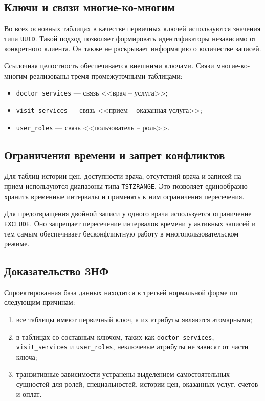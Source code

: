 \subsection{Ключи и связи многие-ко-многим}

Во всех основных таблицах в качестве первичных ключей используются значения типа \texttt{UUID}. Такой подход позволяет формировать идентификаторы независимо от конкретного клиента. Он также не раскрывает информацию о количестве записей.

Ссылочная целостность обеспечивается внешними ключами. Связи многие-ко-многим реализованы тремя промежуточными таблицами:
\begin{itemize}
    \item \texttt{doctor\_services} --- связь <<врач -- услуга>>;
    \item \texttt{visit\_services} --- связь <<прием -- оказанная услуга>>;
    \item \texttt{user\_roles} --- связь <<пользователь -- роль>>.
\end{itemize}

\subsection{Ограничения времени и запрет конфликтов}

Для таблиц истории цен, доступности врача, отсутствий врача и записей на прием используются диапазоны типа \texttt{TSTZRANGE}. Это позволяет единообразно хранить временные интервалы и применять к ним ограничения пересечения.

Для предотвращения двойной записи у одного врача используется ограничение \texttt{EXCLUDE}. Оно запрещает пересечение интервалов времени у активных записей и тем самым обеспечивает бесконфликтную работу в многопользовательском режиме.

\subsection{Доказательство 3НФ}

Спроектированная база данных находится в третьей нормальной форме по следующим причинам:
\begin{enumerate}
    \item все таблицы имеют первичный ключ, а их атрибуты являются атомарными;
    \item в таблицах со составным ключом, таких как \texttt{doctor\_services}, \texttt{visit\_services} и \texttt{user\_roles}, неключевые атрибуты не зависят от части ключа;
    \item транзитивные зависимости устранены выделением самостоятельных сущностей для ролей, специальностей, истории цен, оказанных услуг, счетов и оплат.
\end{enumerate}

